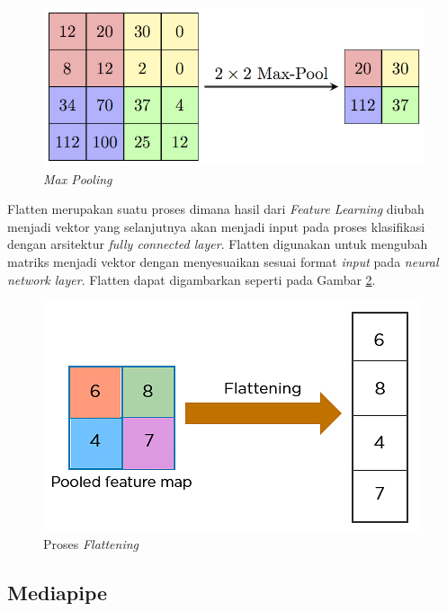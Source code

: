 \begin{figure} [ht] \centering
    \includegraphics[scale=1.5]{gambar/maxPooling.png}
    \caption{\emph{Max Pooling}}
    \label{fig:Max Pooling}
\end{figure}

Flatten merupakan suatu proses dimana hasil dari \emph{Feature Learning} diubah menjadi vektor yang selanjutnya akan menjadi input pada proses klasifikasi dengan arsitektur \emph{fully connected layer}. Flatten digunakan untuk mengubah matriks menjadi vektor dengan menyesuaikan sesuai format \emph{input} pada \emph{neural network layer}. Flatten dapat digambarkan seperti pada Gambar \ref{fig:Proses Flattening}.

\begin{figure} [ht] \centering
    \includegraphics[scale=0.6]{gambar/flattening.png}
    \caption{Proses \emph{Flattening}}
    \label{fig:Proses Flattening}
\end{figure}

\subsection{Mediapipe}

